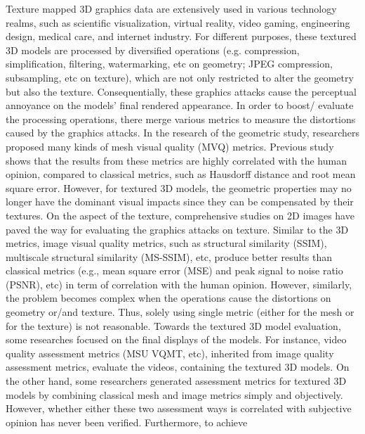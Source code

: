 
Texture mapped 3D graphics data are extensively used in various technology realms, such as scientific visualization, virtual reality, video gaming, engineering design, medical care, and internet industry. For different purposes, these textured 3D models are processed by diversified operations (e.g. compression, simplification, filtering, watermarking, etc on geometry; JPEG compression, subsampling, etc on texture), which are not only restricted to alter the geometry but also the texture. Consequentially, these graphics attacks cause the perceptual annoyance on the models’ final rendered appearance. In order to boost/ evaluate the processing operations, there merge various metrics to measure the distortions caused by the graphics attacks. In the research of the geometric study, researchers proposed many kinds of mesh visual quality (MVQ) metrics. Previous study shows that the results from these metrics are highly correlated with the human opinion, compared to classical metrics, such as Hausdorff distance and root mean square error. However, for textured 3D models, the geometric properties may no longer have the dominant visual impacts since they can be compensated by their textures.  On the aspect of the texture, comprehensive studies on 2D images have paved the way for evaluating the graphics attacks on texture.  Similar to the 3D metrics, image visual quality metrics, such as structural similarity (SSIM), multiscale structural similarity (MS-SSIM), etc, produce better results than classical metrics (e.g., mean square error (MSE) and peak signal to noise ratio (PSNR), etc) in term of correlation with the human opinion. However, similarly, the problem becomes complex when the operations cause the distortions on geometry or/and texture. Thus, solely using single metric (either for the mesh or for the texture) is not reasonable. Towards the textured 3D model evaluation, some researches focused on the final displays of the models. For instance, video quality assessment metrics (MSU VQMT, etc), inherited from image quality assessment metrics, evaluate the videos, containing the textured 3D models.  On the other hand, some researchers generated assessment metrics for textured 3D models by combining classical mesh and image metrics simply and objectively. However, whether either these two assessment ways is correlated with subjective opinion has never been verified. Furthermore, to achieve 